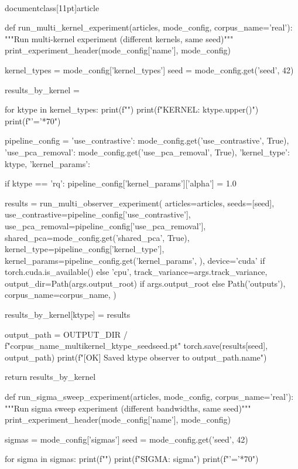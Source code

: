 \\documentclass[11pt]{article}
\begin{document}
\begin{CodeBlock}
def run_multi_kernel_experiment(articles, mode_config, corpus_name='real'):
    """Run multi-kernel experiment (different kernels, same seed)"""
    print_experiment_header(mode_config['name'], mode_config)
    
    kernel_types = mode_config['kernel_types']
    seed = mode_config.get('seed', 42)
    
    results_by_kernel = {}
    
    for ktype in kernel_types:
        print(f"")
        print(f"KERNEL: {ktype.upper()}")
        print(f"{'='*70}")
        
        pipeline_config = {
            'use_contrastive': mode_config.get('use_contrastive', True),
            'use_pca_removal': mode_config.get('use_pca_removal', True),
            'kernel_type': ktype,
            'kernel_params': {}
        }
        
        if ktype == 'rq':
            pipeline_config['kernel_params']['alpha'] = 1.0
        
        results = run_multi_observer_experiment(
            articles=articles,
            seeds=[seed],
            use_contrastive=pipeline_config['use_contrastive'],
            use_pca_removal=pipeline_config['use_pca_removal'],
            shared_pca=mode_config.get('shared_pca', True),
            kernel_type=pipeline_config['kernel_type'],
            kernel_params=pipeline_config.get('kernel_params', {}),
            device='cuda' if torch.cuda.is_available() else 'cpu',
            track_variance=args.track_variance,
            output_dir=Path(args.output_root) if args.output_root else Path('outputs'),
            corpus_name=corpus_name,
        )
        
        results_by_kernel[ktype] = results
        
        output_path = OUTPUT_DIR / f"{corpus_name}_multikernel_{ktype}_seed{seed}.pt"
        torch.save(results[seed], output_path)
        print(f"[OK] Saved {ktype} observer to {output_path.name}")
    
    return results_by_kernel


def run_sigma_sweep_experiment(articles, mode_config, corpus_name='real'):
    """Run sigma sweep experiment (different bandwidths, same seed)"""
    print_experiment_header(mode_config['name'], mode_config)
    
    sigmas = mode_config['sigmas']
    seed = mode_config.get('seed', 42)
    
    for sigma in sigmas:
        print(f"")
        print(f"SIGMA: {sigma}")
        print(f"{'='*70}")
        

\end{CodeBlock}
\end{document}

